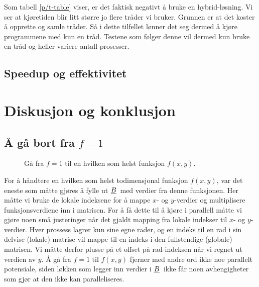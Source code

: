 \documentclass{article}
\newcommand{\ub}[1]{\underbar{$#1$}\,}
\begin{document}
Som tabell \ref{p/t-table} viser, er det faktisk negativt å bruke en hybrid-løsning. Vi ser at kjøretiden blir litt større jo flere tråder vi bruker. Grunnen er at det koster å opprette og samle tråder. Så i dette tilfellet lønner det seg dermed å kjøre programmene med kun en tråd. 
Testene som følger denne vil dermed kun bruke en tråd og heller variere antall prosesser. 


\subsection{Speedup og effektivitet}


\section{Diskusjon og konklusjon}


\subsection{Å gå bort fra $f=1$}
\begin{figure}[h]
	\centering
	
	\caption{Gå fra $f=1$ til en hvilken som helst funksjon $f(x, y)$.}
	\label{fig:local_f}
\end{figure}
For å håndtere en hvilken som helst todimensjonal funksjon $f(x, y)$, var det eneste som måtte gjøres å fylle ut $\ub{B}$ med verdier fra denne funksjonen. Her måtte vi bruke de lokale indeksene for å mappe $x$- og $y$-verdier og multiplisere funksjonsverdiene inn i matrisen. For å få dette til å kjøre i parallell måtte vi gjøre noen små justeringer når det gjaldt mapping fra lokale indekser til $x$- og $y$-verdier. Hver prossess lagrer kun sine egne rader, og en indeks til en rad i sin delvise (lokale) matrise vil mappe til en indeks i den fullstendige (globale) matrisen. Vi måtte derfor plusse på et offset på rad-indeksen når vi regnet ut verdien av $y$. Å gå fra $f=1$ til $f(x, y)$ fjerner med andre ord ikke noe parallelt potensiale, siden løkken som legger inn verdier i $\ub{B}$ ikke får noen avhengigheter som gjør at den ikke kan paralleliseres.
\end{document}
